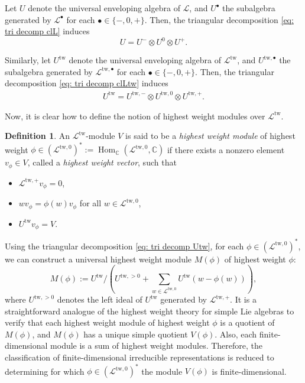 \documentclass[12pt,a4paper]{amsart}
\theoremstyle{definition}
\newtheorem{defi}[thm]{Definition}
\numberwithin{equation}{subsection}
\begin{document}
Let $U$ denote the universal enveloping algebra of $\mathcal{L}$, and $U^\bullet$ the subalgebra generated by $\mathcal{L}^\bullet$ for each $\bullet \in \{ -,0,+ \}$.
Then, the triangular decomposition \eqref{eq: tri decomp clL} induces
\[
  U = U^- \otimes U^0 \otimes U^+.
\]

Similarly, let $U^\mathrm{tw}$ denote the universal enveloping algebra of $\mathcal{L}^\mathrm{tw}$, and $U^{\mathrm{tw},\bullet}$ the subalgebra generated by $\mathcal{L}^{\mathrm{tw},\bullet}$ for each $\bullet \in \{ -,0,+ \}$.
Then, the triangular decomposition \eqref{eq: tri decomp clLtw} induces
\begin{align}\label{eq: tri decomp Utw}
  U^\mathrm{tw} = U^{\mathrm{tw},-} \otimes U^{\mathrm{tw},0} \otimes U^{\mathrm{tw},+}.
\end{align}

Now, it is clear how to define the notion of highest weight modules over $\mathcal{L}^{\mathrm{tw}}$.

\begin{defi}
  An $\mathcal{L}^\mathrm{tw}$-module $V$ is said to be a \emph{highest weight module} of highest weight $\phi \in (\mathcal{L}^{\mathrm{tw},0})^* := \operatorname{Hom}_\mathbb{C}(\mathcal{L}^{\mathrm{tw},0},\mathbb{C})$ if there exists a nonzero element $v_\phi \in V$, called a \emph{highest weight vector}, such that
  \begin{itemize}
    \item $\mathcal{L}^{\mathrm{tw},+} v_\phi = 0$,
    \item $w v_\phi = \phi(w) v_\phi$ for all $w \in \mathcal{L}^{\mathrm{tw},0}$,
    \item $U^\mathrm{tw} v_\phi = V$.
  \end{itemize}
\end{defi}

Using the triangular decomposition \eqref{eq: tri decomp Utw}, for each $\phi \in (\mathcal{L}^{\mathrm{tw},0})^*$, we can construct a universal highest weight module $M(\phi)$ of highest weight $\phi$:
\[
  M(\phi) := U^\mathrm{tw}/(U^{\mathrm{tw},>0} + \sum_{w \in \mathcal{L}^{\mathrm{tw},0}} U^\mathrm{tw}(w-\phi(w))),
\]
where $U^{\mathrm{tw},>0}$ denotes the left ideal of $U^{\mathrm{tw}}$ generated by $\mathcal{L}^{\mathrm{tw},+}$.
It is a straightforward analogue of the highest weight theory for simple Lie algebras to verify that each highest weight module of highest weight $\phi$ is a quotient of $M(\phi)$, and $M(\phi)$ has a unique simple quotient $V(\phi)$.
Also, each finite-dimensional module is a sum of highest weight modules.
Therefore, the classification of finite-dimensional irreducible representations is reduced to determining for which $\phi \in (\mathcal{L}^{\mathrm{tw},0})^*$ the module $V(\phi)$ is finite-dimensional.
\end{document}
